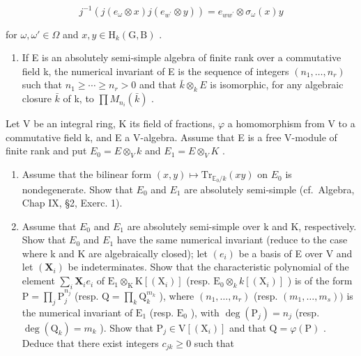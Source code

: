 \[
j ^ {- 1} (j (e _ {\omega} \otimes x) j (e _ {w ^ {\prime}} \otimes y)) = e _ {w w ^ {\prime}} \otimes \sigma_ {\omega} (x) y
\]

for \(\omega, \omega' \in \Omega\) and \(x, y \in \mathrm{H}_k(\mathrm{G}, \mathrm{B})\) .

\begin{enumerate}
\def\labelenumi{\arabic{enumi})}
\setcounter{enumi}{25}
\tightlist
\item
  If E is an absolutely semi-simple algebra of finite rank over a commutative field k, the numerical invariant of E is the sequence of integers \((n_{1},\ldots,n_{r})\) such that \(n_{1}\geqslant\cdots\geqslant n_{r}>0\) and that \(\bar{k}\otimes_{k}E\) is isomorphic, for any algebraic closure \(\bar{k}\) of k, to \(\prod M_{n_{i}}(\bar{k})\) .
\end{enumerate}

Let V be an integral ring, K its field of fractions, \(\varphi\) a homomorphism from V to a commutative field k, and E a V-algebra. Assume that E is a free V-module of finite rank and put \(E_{0} = E \otimes_{V} k\) and \(E_{1} = E \otimes_{V} K\) .

\begin{enumerate}
\def\labelenumi{\alph{enumi})}
\item
  Assume that the bilinear form \((x,y)\mapsto\mathrm{Tr}_{\mathbb{E}_{0}/k}(xy)\) on \(E_{0}\) is nondegenerate. Show that \(E_{0}\) and \(E_{1}\) are absolutely semi-simple (cf.~Algebra, Chap IX, §2, Exerc. 1).
\item
  Assume that \(E_{0}\) and \(E_{1}\) are absolutely semi-simple over k and K, respectively. Show that \(E_{0}\) and \(E_{1}\) have the same numerical invariant (reduce to the case where k and K are algebraically closed); let \((e_{i})\) be a basis of E over V and let \((\mathbf{X}_i)\) be indeterminates. Show that the characteristic polynomial of the element \(\sum_{i}\mathbf{X}_{i}e_{i}\) of \(\mathrm{E}_1\otimes_{\mathrm{K}}\mathrm{K}[(\mathrm{X}_i)]\) (resp. \(\mathrm{E}_0\otimes_kk[(\mathrm{X}_i)]\) ) is of the form \(\mathrm{P} = \prod_j\mathrm{P}_j^{n_j}\) (resp. \(\mathrm{Q} = \prod_k\mathrm{Q}_k^{m_k}\) ), where \((n_1,\ldots ,n_r)\) (resp. \((m_1,\dots ,m_s))\) is the numerical invariant of \(\mathrm{E}_1\) (resp. \(\mathrm{E}_0\) ), with \(\deg (\mathrm{P}_j) = n_j\) (resp. \(\deg (\mathrm{Q}_k) = m_k\) ). Show that \(\mathrm{P}_j\in \mathrm{V}[(\mathrm{X}_i)]\) and that \(\mathrm{Q} = \varphi (\mathrm{P})\) . Deduce that there exist integers \(c_{jk}\geqslant 0\) such that
\end{enumerate}

